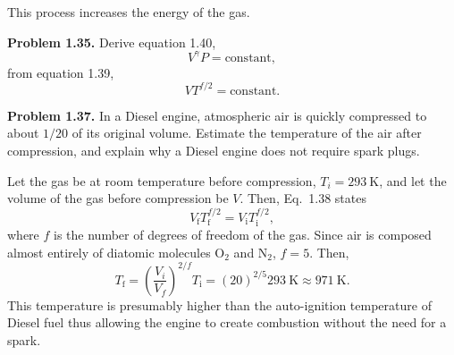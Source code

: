 \documentclass[a4paper, 12pt]{config/homework}
\begin{document}
\noindent
This process increases the energy of the gas.

\bigskip\noindent \textbf{Problem 1.35.} Derive equation 1.40,
\[V^\gamma P = \text{constant},\]
from equation 1.39,
\[VT^{f/2} = \text{constant}.\]

\bigskip\noindent


\pagebreak\noindent
\textbf{Problem 1.37.} In a Diesel engine, atmospheric air is quickly compressed to about \(1/20\) of its original volume. Estimate the temperature of the air after compression, and explain why a Diesel engine does not require spark plugs.

\bigskip\noindent
Let the gas be at room temperature before compression, \(T_i = \qty{293}{\kelvin}\), and let the volume of the gas before compression be \(V\). Then, Eq.\ 1.38 states
\[V_\text{f}T_\text{f}^{f/2} = V_\text{i}T_\text{i}^{f/2},\]
where \(f\) is the number of degrees of freedom of the gas. Since air is composed almost entirely of diatomic molecules \(\text{O}_2\) and \(\text{N}_2\), \(f=5\). Then,
\[T_\text{f} = \left(\frac{V_i}{V_f}\right)^{2/f} T_\text{i} = (20)^{2/5}\qty{293}{\kelvin} \approx \qty{971}{\kelvin}.\]
This temperature is presumably higher than the auto-ignition temperature of Diesel fuel thus allowing the engine to create combustion without the need for a spark.
\end{document}
